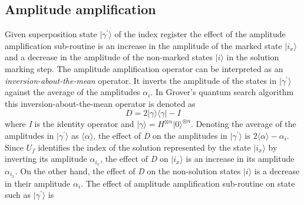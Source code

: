 \subsection*{Amplitude amplification} 
Given superposition state $\vert \gamma^{\prime} \rangle$ of the index register the effect of the amplitude amplification sub-routine is an increase in the amplitude of the marked state $\vert i_{x} \rangle$ and a decrease in the amplitude of the non-marked states $\vert i \rangle$ in the solution marking step. The amplitude amplification operator can be interpreted as an \textit{inversion-about-the-mean} operator. It inverts the amplitude of the states in $\vert \gamma^{\prime} \rangle$ against the average of the amplitudes $\alpha_{i}$. In Grover's quantum search algorithm \cite{Grover1996} this inversion-about-the-mean operator is denoted as 
\begin{equation}
	D=2\vert \gamma \rangle\langle \gamma \vert - I
\end{equation}
where \textit{I} is the identity operator and $\vert \gamma \rangle = H^{\otimes n}\vert 0 \rangle^{\otimes n}$. Denoting the average of the amplitudes in $\vert \gamma^{\prime} \rangle$ as $\langle \alpha \rangle$, the effect of \textit{D} on the amplitudes in $\vert \gamma^{\prime} \rangle$ is $2\langle \alpha \rangle - \alpha_i$. Since $U_f$ identifies the index of the solution represented by the state $\vert i_{x} \rangle$ by inverting its amplitude $\alpha_{i_{x}}$, the effect of \textit{D} on $\vert i_{x} \rangle$ is an increase in its amplitude $\alpha_{i_{x}}$. On the other hand, the effect of \textit{D} on the non-solution states $\vert i \rangle$ is a decrease in their amplitude $\alpha_i$. The effect of amplitude amplification sub-routine on state such as $\vert \gamma^{\prime} \rangle$ is
